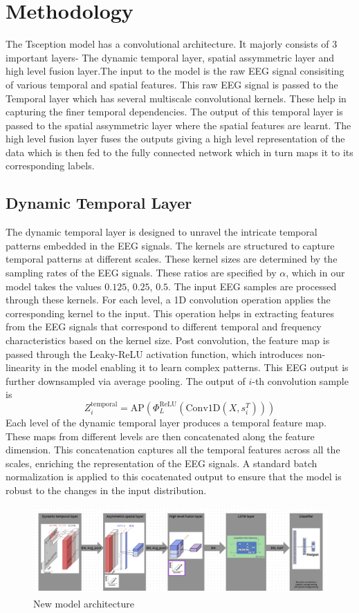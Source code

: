 \section{Methodology}\label{sec:Methodology}
The Tsception model has a convolutional architecture. It majorly consists of 3 important layers- The dynamic temporal layer, spatial assymmetric layer and high level fusion layer.The input to the model is the raw EEG signal consisiting of various temporal and spatial features. This raw EEG signal is passed to the Temporal layer which has several multiscale convolutional kernels. These help in capturing the finer temporal dependencies. The output of this temporal layer is passed to the spatial assymmetric layer where the spatial features are learnt. The high level fusion layer fuses the outputs giving a high level representation of the data which is then fed to the fully connected network which in turn maps it to its corresponding labels.
\subsection*{Dynamic Temporal Layer}
The dynamic temporal layer is designed to unravel the intricate temporal patterns embedded in the EEG signals. The kernels are structured to capture temporal patterns at different scales. These kernel sizes are determined by the sampling rates of the EEG signals. These ratios are specified by $\alpha$, which in our model takes the values $0.125$, $0.25$, $0.5$. The input EEG samples are processed through these kernels. For each level, a 1D convolution operation applies the corresponding kernel to the input. This operation helps in extracting features from the EEG signals that correspond to different temporal and frequency characteristics based on the kernel size. Post convolution, the feature map is passed through the Leaky-ReLU activation function, which introduces non-linearity in the model enabling it to learn complex patterns. This EEG output is further downsampled via average pooling. The output of $i$-th convolution sample is 
\[
Z_i^{\text{temporal}} = \text{AP} \left( \Phi_L^{\text{ReLU}} \left( \text{Conv1D}(X, s_i^T) \right) \right)
\]
Each level of the dynamic temporal layer produces a temporal feature map. These maps from different levels are then concatenated along the feature dimension. This concatenation captures all the temporal features across all the scales, enriching the representation of the EEG signals. A standard batch normalization is applied to this cocatenated output to ensure that the model is robust to the changes in the input distribution.
\begin{figure}[htbp]
    \centering
    \includegraphics[width=\textwidth]{diagram.jpeg}
    \caption{New model architecture}
    \label{fig:yourlabel}
  \end{figure}

